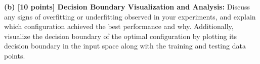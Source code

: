 \documentclass[11pt]{article}
\def\zn#1{{\color{blue}{\bf [ZN:} {\it{#1}}{\bf ]}}}
\begin{document}
\vspace{0.1in}
\noindent\textbf{(b) [10 points] Decision Boundary Visualization and Analysis:} 
Discuss any signs of overfitting or underfitting observed in your experiments, and explain which configuration achieved the best performance and why. Additionally, visualize the decision boundary of the optimal configuration by plotting its decision boundary in the input space along with the training and testing data points.
\end{document}
